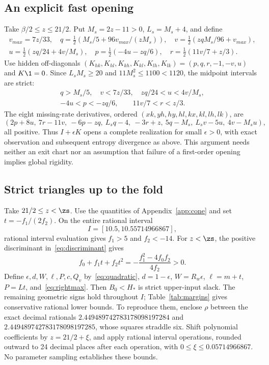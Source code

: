\subsection{An explicit fast opening}
Take $\beta/2\le z\le21/2$. Put $M_s=2z-11>0$, $L_s=M_s+4$, and define
\begin{gather}
 v_{max}=7z/33,\quad
 q=\tfrac12\left(M_s/5+96v_{max}/(zM_s)\right),\quad
 v=\tfrac12\left(zqM_s/96+v_{max}\right),\\
 u=\tfrac12(zq/24+4v/M_s),\quad
 p=\tfrac12(-4u-zq/6),\quad
 r=\tfrac12(11v/7+z/3).
\end{gather}
Use hidden off-diagonals $(K_{hk},K_{hl},K_{kh},K_{kl},K_{lh},K_{lk})=(p,q,r,-1,-v,u)$ and $K\1=0$. Since $L_sM_s\ge20$ and $11M_s^2\le1100<1120$, the midpoint intervals are strict:
\begin{gather}
 q>M_s/5,\quad v<7z/33,\quad zq/24<u<4v/M_s,\\
 -4u<p<-zq/6,\qquad11v/7<r<z/3.
\end{gather}
The eight missing-rate derivatives, ordered $(xk,yh,hy,hl,kx,kl,lh,lk)$, are
\begin{equation}
 (2p+8u,\ 7r-11v,\ -6p-zq,\ L_sq-4,\ -3r+z,\ 5q-M_s,\ L_sv-5u,\ 4v-M_su),
\end{equation}
all positive. Thus $I+\epsilon K$ opens a complete realization for small $\epsilon>0$, with exact observation and subsequent entropy divergence as above. This argument needs neither an exit chart nor an assumption that failure of a first-order opening implies global rigidity.

\subsection{Strict triangles up to the fold}
Take $21/2\le z<\zs$. Use the quantities of Appendix~\ref{app:cone} and set $t=-f_1/(2f_2)$. On the entire rational interval
\begin{equation}
 I=[10.5,10.55714966867],\label{eq:wholeinterval}
\end{equation}
rational interval evaluation gives $f_1>5$ and $f_2<-14$. For $z<\zs$, the positive discriminant in~\eqref{eq:discriminant} gives
\begin{equation}
 f_0+f_1t+f_2t^2=-\frac{f_1^2-4f_0f_2}{4f_2}>0.
\end{equation}
Define $\epsilon,d,W,\ell,P,c,Q_v$ by~\eqref{eq:quadratic}, $d=1-\epsilon$, $W=R_w\epsilon$, $\ell=m+t$, $P=Lt$, and~\eqref{eq:rightmax}. Then $B_0<H_*$ is strict upper-input slack. The remaining geometric signs hold throughout $I$; Table~\ref{tab:margins} gives conservative rational lower bounds. To reproduce them, enclose $\rho$ between the exact decimal rationals $2.449489742783178098197284$ and $2.449489742783178098197285$, whose squares straddle six. Shift polynomial coefficients by $z=21/2+\xi$, and apply rational interval operations, rounded outward to 24 decimal places after each operation, with $0\le\xi\le0.05714966867$. No parameter sampling establishes these bounds.

